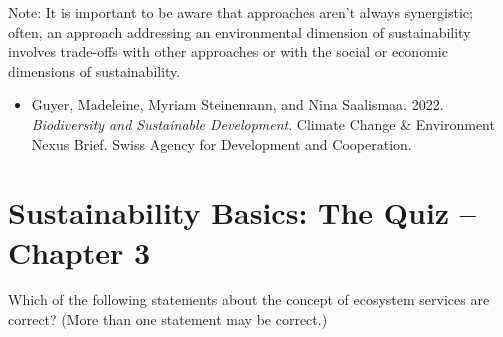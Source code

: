 \documentclass[
  a4paper,
  DIV=11,
  numbers=noendperiod,
  oneside,
  openany]{scrreprt}
\providecommand{\tightlist}{%
  \setlength{\itemsep}{0pt}\setlength{\parskip}{0pt}}
\begin{document}
Note: It is important to be aware that approaches aren't always
synergistic; often, an approach addressing an environmental dimension of
sustainability involves trade-offs with other approaches or with the
social or economic dimensions of sustainability.

\begin{tcolorbox}[enhanced jigsaw, arc=.35mm, bottomrule=.15mm, bottomtitle=1mm, breakable, colback=white, colbacktitle=quarto-callout-caution-color!10!white, colframe=quarto-callout-caution-color-frame, coltitle=black, left=2mm, leftrule=.75mm, opacityback=0, opacitybacktitle=0.6, rightrule=.15mm, title={Further reading}, titlerule=0mm, toprule=.15mm, toptitle=1mm]

\begin{itemize}
\tightlist
\item
  Guyer, Madeleine, Myriam Steinemann, and Nina Saalismaa. 2022.
  \emph{Biodiversity and Sustainable Development}. Climate Change \&
  Environment Nexus Brief. Swiss Agency for Development and Cooperation.
\end{itemize}

\end{tcolorbox}

\section{Sustainability Basics: The Quiz -- Chapter
3}\label{sustainability-basics-the-quiz-chapter-3}

Which of the following statements about the concept of ecosystem
services are correct? (More than one statement may be correct.)
\end{document}
